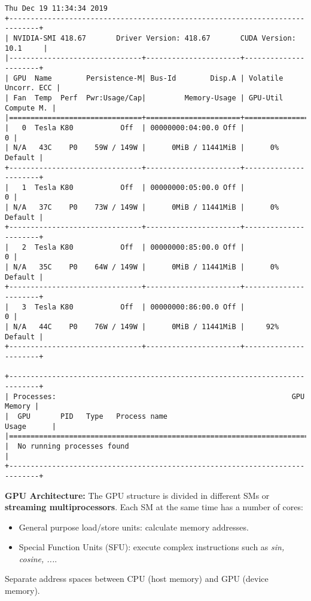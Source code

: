 \begin{lstlisting}[caption={Output of runing \texttt{nvidia-smi} in the cluster.}]
Thu Dec 19 11:34:34 2019       
+-----------------------------------------------------------------------------+
| NVIDIA-SMI 418.67       Driver Version: 418.67       CUDA Version: 10.1     |
|-------------------------------+----------------------+----------------------+
| GPU  Name        Persistence-M| Bus-Id        Disp.A | Volatile Uncorr. ECC |
| Fan  Temp  Perf  Pwr:Usage/Cap|         Memory-Usage | GPU-Util  Compute M. |
|===============================+======================+======================|
|   0  Tesla K80           Off  | 00000000:04:00.0 Off |                    0 |
| N/A   43C    P0    59W / 149W |      0MiB / 11441MiB |      0%      Default |
+-------------------------------+----------------------+----------------------+
|   1  Tesla K80           Off  | 00000000:05:00.0 Off |                    0 |
| N/A   37C    P0    73W / 149W |      0MiB / 11441MiB |      0%      Default |
+-------------------------------+----------------------+----------------------+
|   2  Tesla K80           Off  | 00000000:85:00.0 Off |                    0 |
| N/A   35C    P0    64W / 149W |      0MiB / 11441MiB |      0%      Default |
+-------------------------------+----------------------+----------------------+
|   3  Tesla K80           Off  | 00000000:86:00.0 Off |                    0 |
| N/A   44C    P0    76W / 149W |      0MiB / 11441MiB |     92%      Default |
+-------------------------------+----------------------+----------------------+
                                                                               
+-----------------------------------------------------------------------------+
| Processes:                                                       GPU Memory |
|  GPU       PID   Type   Process name                             Usage      |
|=============================================================================|
|  No running processes found                                                 |
+-----------------------------------------------------------------------------+
\end{lstlisting}

\textbf{GPU Architecture:}
The GPU structure is divided in different SMs or \textbf{streaming multiprocessors}.
Each SM at the same time has a number of cores:
\begin{itemize}
    \item General purpose load/store units: calculate memory addresses.
    \item Special Function Units (SFU): execute complex instructions such as \textit{sin, cosine, ...}.
\end{itemize}
Separate address spaces between CPU (host memory) and GPU (device memory).

